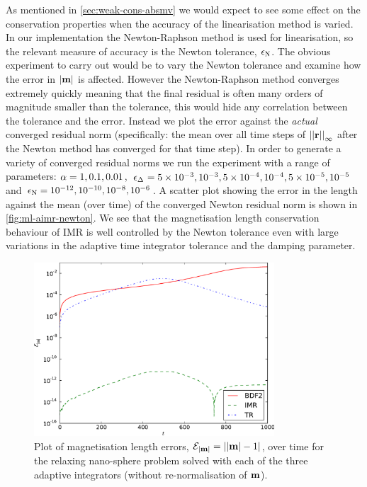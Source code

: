 As mentioned in \cref{sec:weak-cons-absmv} we would expect to see some effect on the conservation properties when the accuracy of the linearisation method is varied.
In our implementation the Newton-Raphson method is used for linearisation, so the relevant measure of accuracy is the Newton tolerance, $\epsilon_{\mathrm{N}}$.
The obvious experiment to carry out would be to vary the Newton tolerance and examine how the error in $\left|{\boldsymbol{\mathrm{m}}} \right|$ is affected.
However the Newton-Raphson method converges extremely quickly meaning that the final residual is often many orders of magnitude smaller than the tolerance, this would hide any correlation between the tolerance and the error.
Instead we plot the error against the \emph{actual} converged residual norm (specifically: the mean over all time steps of $\left| \left| \boldsymbol{\mathrm{r}} \right| \right|_\infty$ after the Newton method has converged for that time step).
In order to generate a variety of converged residual norms we run the experiment with a range of parameters:  $\alpha=1, 0.1, 0.01$, $\epsilon_{\Delta_{}} = 5\times 10^{-3}, 10^{-3}, 5\times10^{-4}, 10^{-4}, 5\times10^{-5}, 10^{-5}$ and $\epsilon_{\mathrm{N}}=10^{-12}, 10^{-10}, 10^{-8}, 10^{-6}$.
A scatter plot showing the error in the length against the mean (over time) of the converged Newton residual norm is shown in \cref{fig:ml-aimr-newton}.
We see that the magnetisation length conservation behaviour of IMR is well controlled by the Newton tolerance even with large variations in the adaptive time integrator tolerance and the damping parameter.

\begin{figure}
  \centering
  \includegraphics[width=0.8\textwidth]{plots/ode_llg_adaptive_ml/mlengtherrormaxesvstimes}
  \caption{Plot of magnetisation length errors, $\mathcal{E}_{\left|{\boldsymbol{\mathrm{m}}} \right|} = \left|{\left|{\boldsymbol{\mathrm{m}}} \right| -1} \right|$, over time for the relaxing nano-sphere problem solved with each of the three adaptive integrators (without re-normalisation of $\boldsymbol{\mathrm{m}}$).}
  \label{fig:ml-aimr-ode}
\end{figure}

